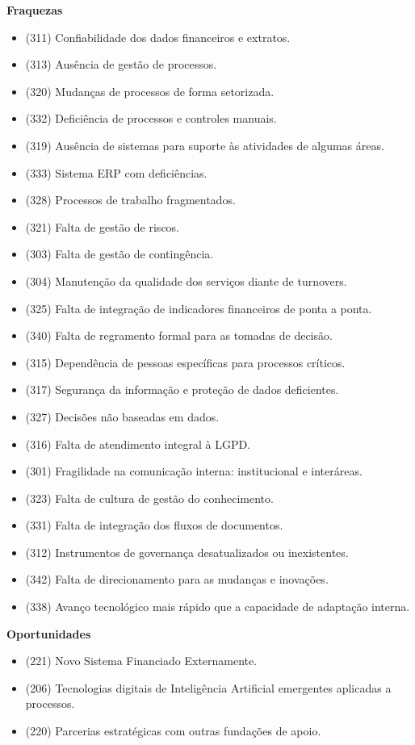 \documentclass[12pt,a4paper]{article}
\begin{document}
\textbf{Fraquezas}
\begin{itemize}[leftmargin=1.27cm,topsep=0pt,itemsep=2pt,parsep=0pt]
  \item (311) Confiabilidade dos dados financeiros e extratos.
  \item (313) Ausência de gestão de processos.
  \item (320) Mudanças de processos de forma setorizada.
  \item (332) Deficiência de processos e controles manuais.
  \item (319) Ausência de sistemas para suporte às atividades de algumas áreas.
  \item (333) Sistema ERP com deficiências.
  \item (328) Processos de trabalho fragmentados.
  \item (321) Falta de gestão de riscos.
  \item (303) Falta de gestão de contingência.
  \item (304) Manutenção da qualidade dos serviços diante de turnovers.
  \item (325) Falta de integração de indicadores financeiros de ponta a ponta.
  \item (340) Falta de regramento formal para as tomadas de decisão.
  \item (315) Dependência de pessoas específicas para processos críticos.
  \item (317) Segurança da informação e proteção de dados deficientes.
  \item (327) Decisões não baseadas em dados.
  \item (316) Falta de atendimento integral à LGPD.
  \item (301) Fragilidade na comunicação interna: institucional e interáreas.
  \item (323) Falta de cultura de gestão do conhecimento.
  \item (331) Falta de integração dos fluxos de documentos.
  \item (312) Instrumentos de governança desatualizados ou inexistentes.
  \item (342) Falta de direcionamento para as mudanças e inovações.
  \item (338) Avanço tecnológico mais rápido que a capacidade de adaptação interna.
\end{itemize}

\textbf{Oportunidades}
\begin{itemize}[leftmargin=1.27cm,topsep=0pt,itemsep=2pt,parsep=0pt]
  \item (221) Novo Sistema Financiado Externamente.
  \item (206) Tecnologias digitais de Inteligência Artificial emergentes aplicadas a processos.
  \item (220) Parcerias estratégicas com outras fundações de apoio.
\end{itemize}
\end{document}
